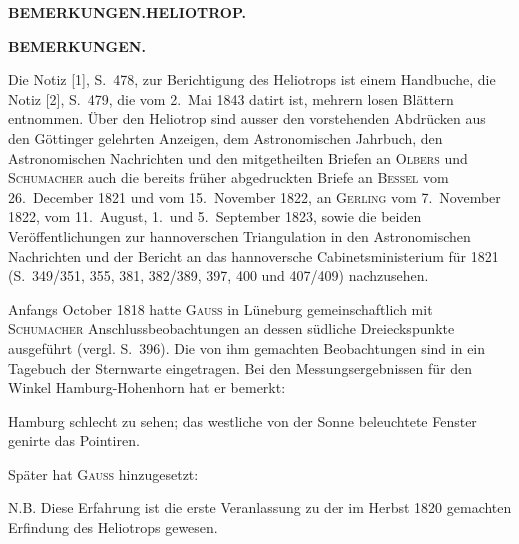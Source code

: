 \clearpage
\noindent\null\hfill{\small\textbf{BEMERKUNGEN.\quad HELIOTROP.}}\hfill{}\par
\vspace*{28mm}
\begin{center}\textbf{BEMERKUNGEN.}\end{center}
\begingroup\small
Die Notiz [1], S.~478, zur Berichtigung des Heliotrops ist einem Handbuche, die Notiz [2], S.~479,
die vom 2.~Mai 1843 datirt ist, mehrern losen Blättern entnommen. Über den Heliotrop sind ausser
den vorstehenden Abdrücken aus den Göttinger gelehrten Anzeigen, dem Astronomischen Jahrbuch, den
Astronomischen Nachrichten und den mitgetheilten Briefen an \textsc{Olbers} und \textsc{Schumacher} auch die bereits
früher abgedruckten Briefe an \textsc{Bessel} vom 26.~December 1821 und vom 15.~November 1822, an \textsc{Gerling}
vom 7.~November 1822, vom 11.~August, 1.~und 5.~September 1823, sowie die beiden Veröffentlichungen zur
hannoverschen Triangulation in den Astronomischen Nachrichten und der Bericht an das hannoversche
Cabinetsministerium für 1821 (S.~349/351, 355, 381, 382/389, 397, 400 und 407/409) nachzusehen.

Anfangs October 1818 hatte \textsc{Gauss} in Lüneburg gemeinschaftlich mit \textsc{Schumacher} Anschlussbeobachtungen
an dessen südliche Dreieckspunkte ausgeführt (vergl. S.~396). Die von ihm gemachten Beobachtungen
sind in ein Tagebuch der Sternwarte eingetragen. Bei den Messungsergebnissen für den Winkel
Hamburg-Hohenhorn hat er bemerkt:

\glqq Hamburg schlecht zu sehen; das westliche von der Sonne beleuchtete Fenster genirte das Pointiren.\grqq

Später hat \textsc{Gauss} hinzugesetzt:

\glqq N.B. Diese Erfahrung ist die erste Veranlassung zu der im Herbst 1820 gemachten Erfindung des
Heliotrops gewesen.\grqq


